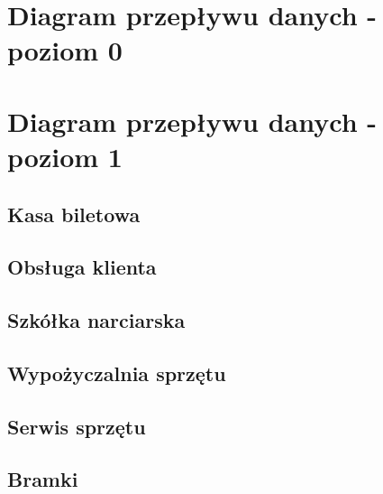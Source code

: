 \documentclass{sprawozdanie-agh}
\begin{document}
\begin{landscape}
    \newpage
    \section{Diagram przepływu danych - poziom 0}
    \begin{figure}
        
    \end{figure}

\newpage
\section{Diagram przepływu danych - poziom 1}
\subsection{Kasa biletowa}
\begin{figure}
    
\end{figure}

\newpage
\subsection{Obsługa klienta}
\begin{figure}
    
\end{figure}

\newpage
\subsection{Szkółka narciarska}
\begin{figure}
    
\end{figure}

\newpage
\subsection{Wypożyczalnia sprzętu}
\begin{figure}
    
\end{figure}

\newpage
\subsection{Serwis sprzętu}
\begin{figure}
    
\end{figure}

\newpage
\subsection{Bramki}
\begin{figure}
    
\end{figure}
\end{landscape}
\end{document}

